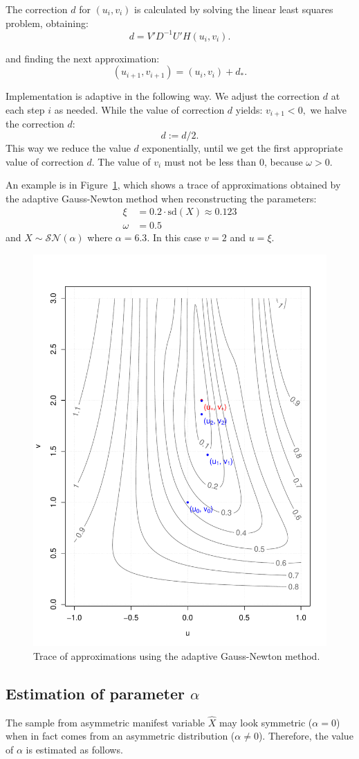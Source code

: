 \documentclass[10pt]{article}
\begin{document}
The correction $d$ for $(u_{i}, v_{i})$ is calculated by solving the linear least squares problem, obtaining:
$$
d = V' D^{-1} U' H(u_{i}, v_{i}).
$$

and finding the next approximation:
$$
(u_{i+1}, v_{i+1}) = (u_{i}, v_{i}) + d_{*}.
$$

Implementation is adaptive in the following way. We adjust the correction $d$ at each step $i$ as needed. While the value of correction $d$ yields:
$v_{i+1} < 0,$
we halve the correction $d$:
$$
d := d/2.
$$
This way we reduce the value $d$ exponentially, until we get the first appropriate value of correction $d$. The value of $v_{i}$ must not be less than 0, because $\omega > 0$. 

An example is in Figure~\ref{fig: newton_trace}, which shows a trace of approximations obtained by the adaptive Gauss-Newton method when reconstructing the parameters:
\begin{align*}
\xi &= 0.2 \cdot \mathrm{sd}(X) \approx 0.123 \\
\omega &= 0.5
\end{align*}
and $X \sim \mathcal{SN}(\alpha)$ where $\alpha = 6.3$. In this case $v = 2$ and $u = \xi$. 

\begin{figure}
  \centering
  \includegraphics[width=0.4\linewidth]{newton_trace_WCVT.pdf}
  \caption{ Trace of approximations using the adaptive Gauss-Newton method.}
  \label{fig: newton_trace}
\end{figure}


\subsection{Estimation of parameter $\alpha$} 

The sample from asymmetric manifest variable $\hat{X}$ may look symmetric ($\alpha = 0$) when in fact comes from an asymmetric distribution ($\alpha \neq 0$). Therefore, the value of $\alpha$ is estimated as follows.
\end{document}
